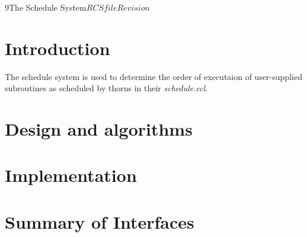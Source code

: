 %   

\begin{cactuspart}{9}{The Schedule System}{$RCSfile$}{$Revision$}
\renewcommand{\thepage}{\Alph{part}\arabic{page}}

\chapter{Introduction}

The schedule system is used to determine the order of executaion of
user-supplied subroutines as scheduled by thorns in their {\em schedule.ccl}.

\chapter{Design and algorithms}

\chapter{Implementation}

\chapter{Summary of Interfaces}

\end{cactuspart}

